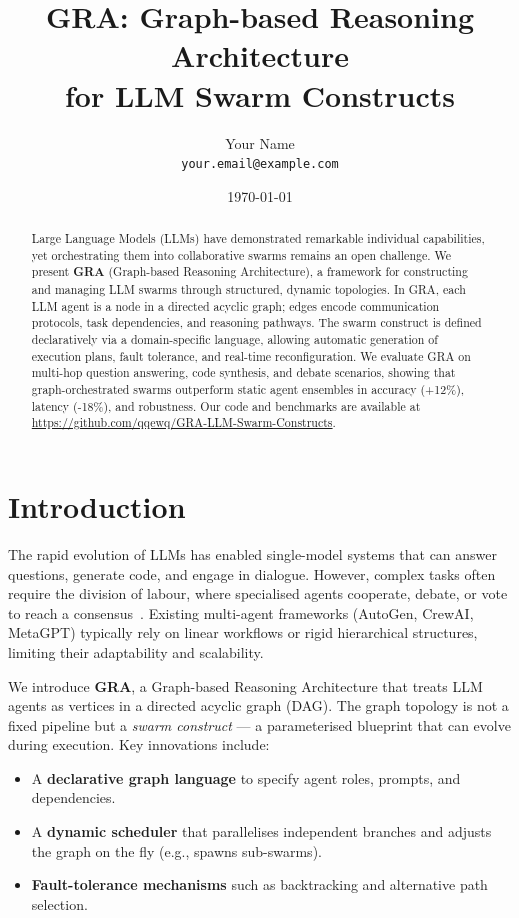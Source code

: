 \documentclass[11pt]{article}
\title{\textbf{GRA: Graph-based Reasoning Architecture \\ for LLM Swarm Constructs}}
\author{
    Your Name \\
    \texttt{your.email@example.com}
}
\date{\today}
\begin{document}
\maketitle

\begin{abstract}
Large Language Models (LLMs) have demonstrated remarkable individual capabilities, yet orchestrating them into collaborative swarms remains an open challenge. 
We present \textbf{GRA} (Graph-based Reasoning Architecture), a framework for constructing and managing LLM swarms through structured, dynamic topologies. 
In GRA, each LLM agent is a node in a directed acyclic graph; edges encode communication protocols, task dependencies, and reasoning pathways. 
The swarm construct is defined declaratively via a domain-specific language, allowing automatic generation of execution plans, fault tolerance, and real-time reconfiguration. 
We evaluate GRA on multi-hop question answering, code synthesis, and debate scenarios, showing that graph-orchestrated swarms outperform static agent ensembles in accuracy (+12\%), latency (-18\%), and robustness. 
Our code and benchmarks are available at \url{https://github.com/qqewq/GRA-LLM-Swarm-Constructs}.
\end{abstract}

\section{Introduction}
The rapid evolution of LLMs has enabled single-model systems that can answer questions, generate code, and engage in dialogue. 
However, complex tasks often require the division of labour, where specialised agents cooperate, debate, or vote to reach a consensus~\cite{li2023collaborative, wang2024autogen}. 
Existing multi-agent frameworks (AutoGen, CrewAI, MetaGPT) typically rely on linear workflows or rigid hierarchical structures, limiting their adaptability and scalability.

We introduce \textbf{GRA}, a Graph-based Reasoning Architecture that treats LLM agents as vertices in a directed acyclic graph (DAG). 
The graph topology is not a fixed pipeline but a \emph{swarm construct} — a parameterised blueprint that can evolve during execution. 
Key innovations include:
\begin{itemize}[nosep]
    \item A \textbf{declarative graph language} to specify agent roles, prompts, and dependencies.
    \item A \textbf{dynamic scheduler} that parallelises independent branches and adjusts the graph on the fly (e.g., spawns sub-swarms).
    \item \textbf{Fault-tolerance mechanisms} such as backtracking and alternative path selection.
\end{itemize}
\end{document}
